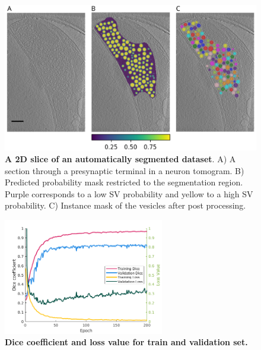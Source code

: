 \begin{fignos:tagged-figure}[EV1]

\begin{figure}
\hypertarget{fig:suppl_tom_slice}{%
\centering
\includegraphics[width=15cm,height=\textheight]{images/tomo-scale.svg}
\caption{\textbf{A 2D slice of an automatically segmented dataset}. A) A section through a presynaptic terminal in a neuron tomogram. B) Predicted probability mask restricted to the segmentation region. Purple corresponds to a low SV probability and yellow to a high SV probability. C) Instance mask of the vesicles after post processing.}\label{fig:suppl_tom_slice}
}
\end{figure}

\end{fignos:tagged-figure}

\begin{fignos:tagged-figure}[EV2]

\begin{figure}
\hypertarget{fig:dice}{%
\centering
\includegraphics[width=7cm,height=\textheight]{images/traindice.png}
\caption{\textbf{Dice coefficient and loss value for train and validation set.}}\label{fig:dice}
}
\end{figure}

\end{fignos:tagged-figure}

